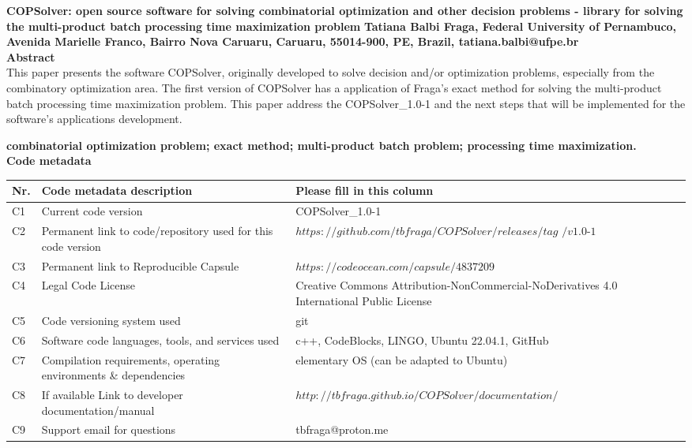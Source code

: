 \documentclass[11pt, letterpaper]{article}
\begin{document}
\noindent
\textbf{COPSolver: open source software for solving combinatorial optimization and other decision problems - library for solving the multi-product batch processing time maximization problem}
\vskip0.5cm
\noindent
\textbf{Tatiana Balbi Fraga, Federal University of Pernambuco, Avenida Marielle
Franco, Bairro Nova Caruaru, Caruaru, 55014-900, PE, Brazil, tatiana.balbi@ufpe.br}\\

\noindent
\textbf{Abstract}\\
This paper presents the software COPSolver, originally developed to solve decision and/or optimization problems, especially from the combinatory optimization area. The first version of COPSolver has a application of Fraga's exact method for solving the multi-product batch processing time maximization problem. This paper address the COPSolver\_1.0-1 and the next steps that will be implemented for the software's applications development.
\vskip0.5cm

\noindent
\textbf{combinatorial optimization problem; exact method; multi-product batch problem; processing time maximization.}\\
\vskip0.5cm
\newpage
\noindent
\textbf{Code metadata}\\

\noindent
\begin{tabular}{|l|p{6.5cm}|p{9.5cm}|}
\hline
\textbf{Nr.} & \textbf{Code metadata description} & \textbf{Please fill in this column} \\
\hline
C1 & Current code version & COPSolver\_1.0-1 \\
\hline
C2 & Permanent link to code/repository used for this code version & $https://github.com/tbfraga/COPSolver/releases/tag$ $/v1.0\textrm{-}1$ \\
\hline
C3  & Permanent link to Reproducible Capsule & $https://codeocean.com/capsule/4837209$\\
\hline
C4 & Legal Code License   & Creative Commons Attribution-NonCommercial-NoDerivatives 4.0 International Public License \\
\hline
C5 & Code versioning system used & git \\
\hline
C6 & Software code languages, tools, and services used & c++, CodeBlocks, LINGO, Ubuntu 22.04.1, GitHub\\
\hline
C7 & Compilation requirements, operating environments \& dependencies & elementary OS (can be adapted to Ubuntu) \\
\hline
C8 & If available Link to developer documentation/manual & \underline{$http://tbfraga.github.io/COPSolver/documentation/$} \\
\hline
C9 & Support email for questions & tbfraga@proton.me\\
\hline
\end{tabular}\\
\vskip0.5cm
\noindent
\end{document}
